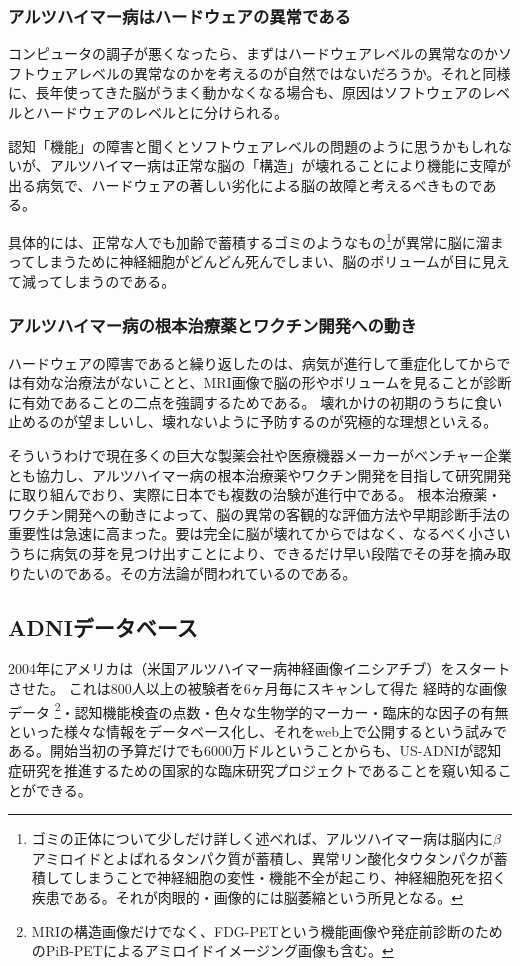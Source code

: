 \subsubsection{アルツハイマー病はハードウェアの異常である}
コンピュータの調子が悪くなったら、まずはハードウェアレベルの異常なのかソフトウェアレベルの異常なのかを考えるのが自然ではないだろうか。それと同様に、長年使ってきた脳がうまく動かなくなる場合も、原因はソフトウェアのレベルとハードウェアのレベルとに分けられる。

認知「機能」の障害と聞くとソフトウェアレベルの問題のように思うかもしれないが、アルツハイマー病は正常な脳の「構造」が壊れることにより機能に支障が出る病気で、ハードウェアの著しい劣化による脳の故障と考えるべきものである。

具体的には、正常な人でも加齢で蓄積するゴミのようなもの\footnote{ゴミの正体について少しだけ詳しく述べれば、アルツハイマー病は脳内に$\beta$アミロイドとよばれるタンパク質が蓄積し、異常リン酸化タウタンパクが蓄積してしまうことで神経細胞の変性・機能不全が起こり、神経細胞死を招く疾患である。それが肉眼的・画像的には脳萎縮という所見となる。}が異常に脳に溜まってしまうために神経細胞がどんどん死んでしまい、脳のボリュームが目に見えて減ってしまうのである。

\subsubsection{アルツハイマー病の根本治療薬とワクチン開発への動き}
ハードウェアの障害であると繰り返したのは、病気が進行して重症化してからでは有効な治療法がないことと、MRI画像で脳の形やボリュームを見ることが診断に有効であることの二点を強調するためである。
壊れかけの初期のうちに食い止めるのが望ましいし、壊れないように予防するのが究極的な理想といえる。

そういうわけで現在多くの巨大な製薬会社や医療機器メーカーがベンチャー企業とも協力し、アルツハイマー病の根本治療薬やワクチン開発を目指して研究開発に取り組んでおり、実際に日本でも複数の治験が進行中である。
根本治療薬・ワクチン開発への動きによって、脳の異常の客観的な評価方法や早期診断手法の重要性は急速に高まった。要は完全に脳が壊れてからではなく、なるべく小さいうちに病気の芽を見つけ出すことにより、できるだけ早い段階でその芽を摘み取りたいのである。その方法論が問われているのである。
\subsection{ADNIデータベース}
2004年にアメリカは（米国アルツハイマー病神経画像イニシアチブ）をスタートさせた。
これは800人以上の被験者を6ヶ月毎にスキャンして得た
経時的な画像データ
\footnote{
MRIの構造画像だけでなく、FDG-PETという機能画像や発症前診断のためのPiB-PETによるアミロイドイメージング画像も含む。}・認知機能検査の点数・色々な生物学的マーカー・臨床的な因子の有無といった様々な情報をデータベース化し、それをweb上で公開するという試みである。開始当初の予算だけでも6000万ドルということからも、US-ADNIが認知症研究を推進するための国家的な臨床研究プロジェクトであることを窺い知ることができる。

